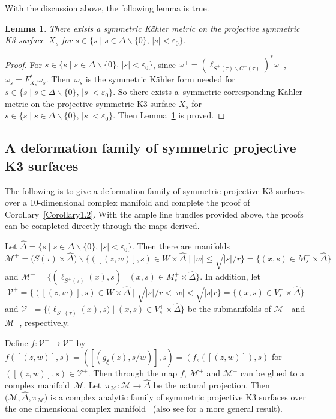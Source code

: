\documentclass[10pt,a4paper]{amsart}
\numberwithin{equation}{section}
\newtheorem{Lemma}[Theorem]{Lemma}
\begin{document}
With the discussion above, the following lemma is true.

\begin{Lemma} \label{Lemma4.2}
There exists a symmetric K\"ahler metric on the projective symmetric K3 surface~$X_s$ for $s \in \{ s\mid s \in \Delta \backslash \{ 0 \},\, |s|<\varepsilon_0 \}$.
\end{Lemma}

\begin{proof}
For $s \in \{ s\mid s \in \Delta \backslash \{ 0 \},\, |s|<\varepsilon_0 \}$, since $\omega^+=(\ell_{S^+(\tau)\backslash C^+(\tau)})^*\omega^-$, $\omega_s=F^*_{X_s}\omega_s$. Then~$\omega_s$ is the symmetric K\"ahler form needed for $s \in \{ s\mid s \in \Delta \backslash \{ 0 \},\, |s|<\varepsilon_0 \}$. So there exists a~symmetric corresponding K\"ahler metric on the projective symmetric K3 surface $X_s$ for $s \in \{ s\mid s \in \Delta \backslash \{ 0 \},\, |s|<\varepsilon_0 \}$. Then Lemma~\ref{Lemma4.2} is proved.
\end{proof}

\subsection{A deformation family of symmetric projective K3 surfaces}

The following is to give a deformation family of symmetric projective K3 surfaces over a 10-dimensional complex manifold and complete the proof of Corollary~\ref{Corollary1.2}. With the ample line bundles provided above, the proofs can be completed directly through the maps derived.

Let $\hat{\Delta}=\{ s\mid s \in \Delta \backslash \{ 0 \},\, |s|<\varepsilon_0 \}$. Then there are manifolds
\[\mathcal{M}^+=\bigl(S(\tau)\times \hat{\Delta}\bigr)\backslash \bigl\{ ([(z,w)],s)\in W \times \hat{\Delta} \mid |w|\leq \sqrt{|s|}/r \bigr\}=\bigl\{ (x,s) \in M^+_s \times \hat{\Delta}\bigr\}\]
and
$\mathcal{M}^-=\bigl\{(\ell_{S^+(\tau)}(x),s) \mid (x,s) \in M^+_s \times \hat{\Delta}\bigr\}$.
In addition, let
\[\mathcal{V}^+=\bigl\{ ([(z,w)],s)\in W \times \hat{\Delta} \mid \sqrt{|s|}/r <|w| <\sqrt{|s|} r\bigr\}=\bigl\{ (x,s) \in V^+_s \times \hat{\Delta}\bigr\}\]
and
$\mathcal{V}^-=\bigl\{ \bigl(\ell_{S^+(\tau)}(x),s\bigr) \mid (x,s) \in V^+_s \times \hat{\Delta}\bigr\}$
be the submanifolds of $\mathcal{M}^+$ and $\mathcal{M}^-$, respectively.

Define $f\colon\mathcal{V}^+ \rightarrow \mathcal{V}^-$ by
$f([(z,w)],s)=([(g_\xi(z),s/w)],s)=(f_s([(z,w)]),s)$
for $([(z,w)],s)\allowbreak\in \mathcal{V}^+$. Then through the map $f$, $\mathcal{M}^+$ and $\mathcal{M}^-$ can be glued to a complex manifold~$\mathcal{M}$. Let~${\pi_{\mathcal{M}}\colon\mathcal{M} \rightarrow \hat{\Delta}}$ be the natural projection. Then $\bigl(\mathcal{M}, \hat{\Delta}, \pi_{\mathcal{M}}\bigr)$ is a complex analytic family of symmetric projective K3 surfaces over the one dimensional complex manifold~\smash{$\hat{\Delta}$} (also see \cite{Takayuki-Takato2} for a more general result).
\end{document}
